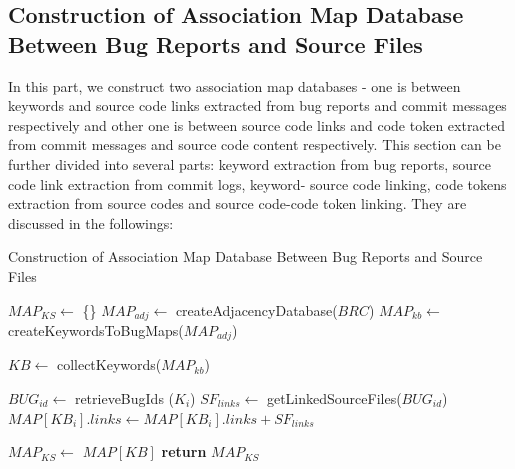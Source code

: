 \documentclass[conference]{IEEEtran}
\begin{document}
\subsection{Construction of Association Map Database Between Bug Reports and Source Files}
In this part, we construct two association map databases - one is between keywords and source code links extracted from bug reports and commit messages respectively and other one is between source code links and code token extracted from commit messages and source code content respectively. This section can be further divided into several parts: keyword extraction from bug reports, source code link extraction from commit logs, keyword- source code linking, code tokens extraction from source codes and source code-code token linking. They are discussed in the followings:

\begin{algorithm}[!t]
	\caption{Construction of Association Map Database Between Bug Reports and Source Files}
	\label{map}
	\begin{algorithmic}[1]
		\State $MAP_{KS} \gets$ \{\}
		\State $MAP_{adj} \gets$ createAdjacencyDatabase($BRC$)
		\State $MAP_{kb} \gets$ createKeywordsToBugMaps($MAP_{adj}$)
		
		\State $KB \gets$ collectKeywords($MAP_{kb}$)
		
		\State $BUG_{id} \gets$ retrieveBugIds ($K_i$)
		\State $SF_{links} \gets$ getLinkedSourceFiles($BUG_{id}$)
		\State $MAP[KB_i].links \gets MAP[KB_{i}].links + SF_{links}$
		\EndFor
		\EndFor
		
		\State $MAP_{KS} \gets$ $MAP[KB]$ 
		\State \textbf{return} $MAP_{KS}$
		\EndProcedure
	\end{algorithmic}
\end{algorithm}
\end{document}
